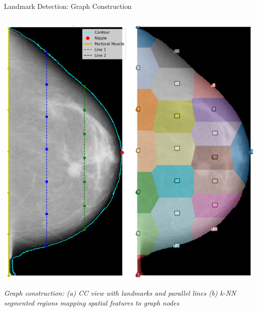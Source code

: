 \documentclass[8pt,aspectratio=169,xcolor=dvipsnames]{beamer}
\begin{document}
\begin{frame}{Landmark Detection: Graph Construction}
\begin{columns}
        \begin{column}{0.42\textwidth}
            \centering
            \includegraphics[width=\textwidth]{knn.png}
            
            \vspace{0.1cm}
            
            \tiny
            \textit{Graph construction: (a) CC view with landmarks and parallel lines (b) k-NN segmented regions mapping spatial features to graph nodes}
        \end{column}
    \end{columns}
    
\end{frame}
\end{document}
